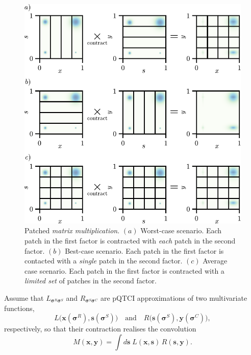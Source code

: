\begin{figure}[ht!]
\centering
\includegraphics{figures/2DPatchMatMul.pdf}
\caption{Patched \textit{matrix multiplication}. $(a)$ Worst-case scenario. Each patch in the first factor is contracted with \textit{each} patch in the second factor. $(b)$ Best-case scenario. Each patch in the first factor is contacted with a \textit{single} patch in the second factor. $(c)$ Average case scenario. Each patch in the first factor is contracted with a \textit{limited set} of patches in the second factor.}
\label{fig:2DPatchMatMul}
\end{figure}

Assume that \(L_{\boldsymbol{\sigma}^{R}\boldsymbol{\sigma}^{S}}\) and
\(R_{\boldsymbol{\sigma}^{S}\boldsymbol{\sigma}^{C}}\) are pQTCI
approximations of two multivariate functions,
\[
  L\bigl(\boldsymbol{x}(\boldsymbol{\sigma}^{R}),
          \boldsymbol{s}(\boldsymbol{\sigma}^{S})\bigr)
  \quad\text{and}\quad
  R\bigl(\boldsymbol{s}(\boldsymbol{\sigma}^{S}),
          \boldsymbol{y}(\boldsymbol{\sigma}^{C})\bigr),
\]
respectively, so that their contraction realises the convolution
\begin{equation}
  M(\boldsymbol{x},\boldsymbol{y})
  = \int\!d\boldsymbol{s}\;
      L(\boldsymbol{x},\boldsymbol{s})\,
      R(\boldsymbol{s},\boldsymbol{y}).
  \label{eq:convTypeInt}
\end{equation}

